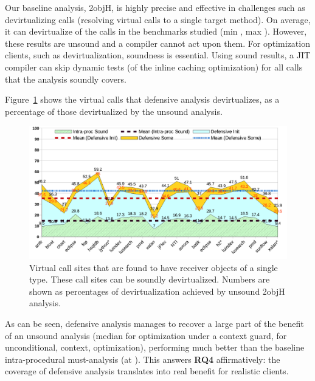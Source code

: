 Our baseline analysis, 2objH, is highly precise and effective in challenges such as devirtualizing calls (resolving virtual calls to a single target method). On average, it can devirtualize  of the calls in the benchmarks studied (min , max ). However, these results are unsound and a compiler cannot act upon them. For optimization clients, such as devirtualization, soundness is essential. Using sound results, a JIT compiler can skip dynamic tests (of the inline caching optimization) for all calls that the analysis soundly covers.

Figure~\ref{fig:sound:devirt1} shows the virtual calls that defensive analysis devirtualizes, as a percentage of those devirtualized by the unsound analysis.

\begin{figure}[tbh]
\centering
\includegraphics[width=\linewidth]{assets/defensive/devirt1.pdf}
\caption{Virtual call sites that are found to have receiver objects of a single type. These call sites can be soundly devirtualized. Numbers are shown as percentages of devirtualization achieved by unsound 2objH analysis.}
\label{fig:sound:devirt1}
\end{figure}

As can be seen, defensive analysis manages to recover a large part of the benefit of an unsound analysis (median  for optimization under a context guard,  for unconditional, \ctxInit{} context, optimization), performing much better than the baseline intra-procedural must-analysis (at ). This answers \textbf{RQ4} affirmatively: the coverage of defensive analysis translates into real benefit for realistic clients.


